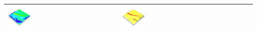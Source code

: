 \documentclass[prodmode,acmtochi]{acmsmall} %
\begin{document}
\begin{table}
{\begin{tabular}{m{} m{} m{} m{} m{}}
\includegraphics[width=0.22\textwidth]{images/render_3d/mean_slope_4.png} &
\includegraphics[width=0.22\textwidth]{images/render_3d/mean_forms_4.png}\\
%
\bottomrule
\end{tabular}}
\label{table:difference_experiment} 
\end{table}
\end{document}
